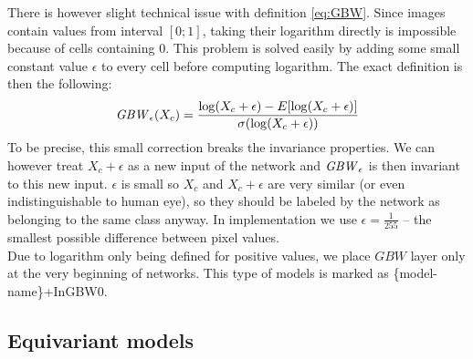 There is however slight technical issue with definition \ref{eq:GBW}.
Since images contain values from interval $[0;1]$,
taking their logarithm directly is impossible because of
cells containing $0$. This problem is solved easily by adding some small constant value
$\epsilon$ to every cell before computing logarithm. The exact definition
is then the following:
\begin{equation}
\mathit{GBW}_{\epsilon}(X_c) =
    \frac{\log(X_c+\epsilon)-E[\log(X_c+\epsilon)]}{\sigma(\log(X_c+\epsilon))}
\end{equation}
To be precise, this small correction breaks the invariance properties.
We can however treat $X_c+\epsilon$ as a new input of the network
and $\mathit{GBW}_{\epsilon}$ is then invariant to this new input.
$\epsilon$ is small so $X_c$ and $X_c+\epsilon$ are very similar (or even
indistinguishable to human eye), so they should be labeled by the network as
belonging to the same class anyway. In implementation we use
$\epsilon=\frac{1}{255}$ -- the smallest possible difference between pixel
values.
\\ Due to logarithm only being defined for positive values, we place
$\mathit{GBW}$ layer only at the very beginning of networks. This type of models
is marked as \{model-name\}+InGBW0.



\subsection{Equivariant models}
\label{sec:equ_models}

